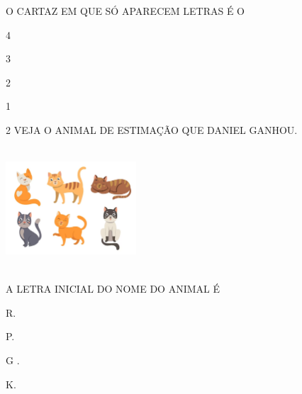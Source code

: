 

O CARTAZ EM QUE SÓ APARECEM LETRAS É O

\begin{escolha}
\item 4

\item 3

\item 2 

\item 1
\end{escolha}

\num{2} VEJA O ANIMAL DE ESTIMAÇÃO QUE DANIEL GANHOU.

\includegraphics[width=1.91250in,height=1.79167in]{media/image187.png}


A LETRA INICIAL DO NOME DO ANIMAL É 

\begin{escolha}
\item R.

\item P.

\item G .

\item K.
\end{escolha}

